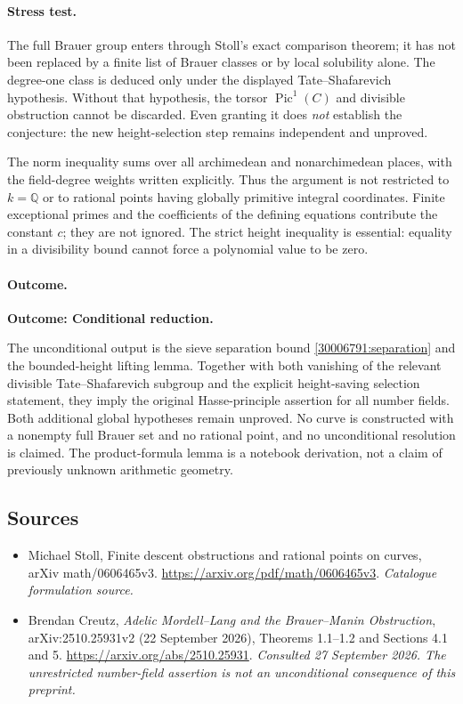 \documentclass[11pt,a4paper]{article}
\newcommand{\Q}{\mathbb{Q}}
\begin{document}
\paragraph{Stress test.}
The full Brauer group enters through Stoll's exact comparison theorem;
it has not been replaced by a finite list of Brauer classes or by local
solubility alone. The degree-one class is deduced only under the displayed
Tate--Shafarevich hypothesis. Without that hypothesis, the torsor
$\operatorname{Pic}^1(C)$ and divisible obstruction cannot be discarded.
Even granting it does \emph{not} establish the conjecture: the new
height-selection step remains independent and unproved.

The norm inequality sums over all archimedean and nonarchimedean places,
with the field-degree weights written explicitly. Thus the argument is
not restricted to $k=\Q$ or to rational points having globally primitive
integral coordinates. Finite exceptional primes and the coefficients of
the defining equations contribute the constant $c$; they are not ignored.
The strict height inequality is essential: equality in a divisibility
bound cannot force a polynomial value to be zero.

\paragraph{Outcome.}
\textbf{Outcome: Conditional reduction.}

The unconditional output is the sieve separation bound
\eqref{30006791:separation} and the bounded-height lifting lemma. Together with
both vanishing of the relevant divisible Tate--Shafarevich subgroup and
the explicit height-saving selection statement, they imply the original
Hasse-principle assertion for all number fields. Both additional global
hypotheses remain unproved. No curve is constructed with a nonempty full
Brauer set and no rational point, and no unconditional resolution is
claimed. The product-formula lemma is a notebook derivation, not a claim
of previously unknown arithmetic geometry.
\subsection{Sources}
\begin{itemize}\raggedright
\item[\textnormal{[S1]}]\hypertarget{source:30006791:1}{} Michael Stoll, Finite descent obstructions and rational points on curves, arXiv math/0606465v3.
\url{https://arxiv.org/pdf/math/0606465v3}.
{\small\textit{Catalogue formulation source.}}
\item[\textnormal{[E1]}]\hypertarget{extra:30006791:1}{} Brendan Creutz,
\emph{Adelic Mordell--Lang and the Brauer--Manin Obstruction},
arXiv:2510.25931v2 (22 September 2026), Theorems 1.1--1.2 and Sections 4.1 and 5.
\url{https://arxiv.org/abs/2510.25931}.
{\small\textit{Consulted 27 September 2026. The unrestricted number-field assertion is not an unconditional consequence of this preprint.}}
\end{itemize}
\end{document}
